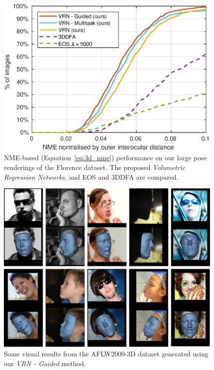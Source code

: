 \begin{figure}
  \centering
  \includegraphics[width=0.75\linewidth]{curves/florence.eps}
  \caption[NME performance on Florence renderings]{NME-based
    (Equation~\ref{eq:3d_nme}) performance on our large pose
    renderings of the Florence dataset. The proposed
    \textit{Volumetric Regression Networks}, and EOS and 3DDFA are
    compared.}
  \label{roc:florence}
\end{figure}




\begin{figure}
  \centering
  \includegraphics[width=0.7\linewidth]{img/aflw2000res.pdf}
  \caption[Visual results on AFLW2000-3D dataset]{Some visual results
    from the AFLW2000-3D dataset generated using our \textit{VRN -
      Guided} method.}
  \label{fig:aflw2000res}
  \vspace{-4mm}
\end{figure}


